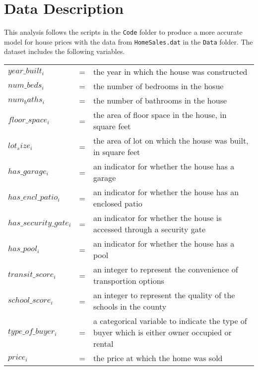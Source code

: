 
\section{Data Description}

This analysis follows the scripts in the  \texttt{Code} folder to produce a more accurate model for house prices with the data from \texttt{HomeSales.dat} in the \texttt{Data} folder. 
The dataset includes the following variables.
\begin{table}[h!]
\begin{tabular}{l l l}

$year\_built_i$ & = & the year in which the house was constructed \\
$num\_beds_i$ & = & the number of bedrooms in the hosue \\
$num_baths_i$ & = & the number of bathrooms in the house \\
$floor\_space_i$ & = & the area of floor space in the house, in square feet  \\
$lot_size_i$ & = & the area of lot on which the house was built, in square feet \\
$has\_garage_i$ & = & an indicator for whether the house has a garage\\ %
$has\_encl\_patio_i$ & = & an indicator for whether the house has an enclosed patio \\ %
$has\_security\_gate_i$ & = & an indicator for whether the house is accessed through a security gate\\ %
$has\_pool_i$ & = & an indicator for whether the house has a pool \\ %
$transit\_score_i$ & = & an integer to represent the convenience of transportion options \\ %
$school\_score_i$ & = & an integer to represent the quality of the schools in the county \\ %
$type\_of\_buyer_i$ & = & a categorical variable to indicate the type of buyer which is either owner occupied or rental \\ %
$price_i$ & = & the price at which the home was sold \\ %

\end{tabular}
\end{table}
%

